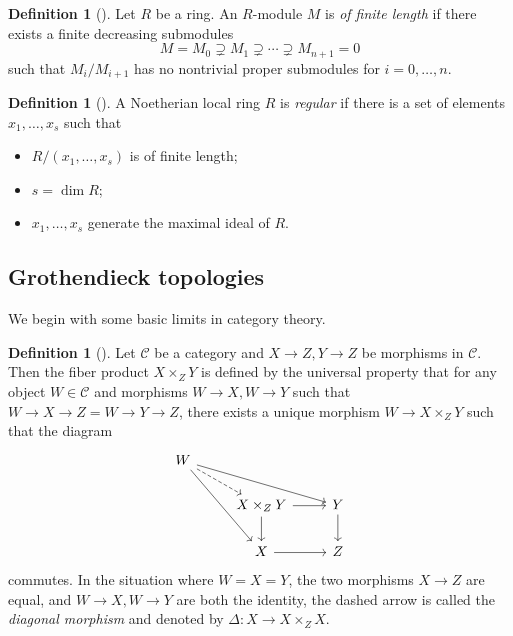 \documentclass{amsart}
\theoremstyle{definition}
\newtheorem{defn}[thm]{Definition}
\theoremstyle{remark}
\theoremstyle{plain}
\theoremstyle{definition}
\theoremstyle{remark}
\newcommand{\mc}[1]{\mathcal{#1}}
\newcommand{\1}{\mathbf{1}}
\newcommand{\2}{\mathbf{2}}
\newcommand{\3}{\mathbf{3}}
\begin{document}
\begin{defn}[{\cite[Definition 1.4.23]{canotes}}]
    Let $R$ be a ring. An $R$-module $M$ is \textit{of finite length} if there exists a finite decreasing submodules
    \[ M = M_0 \supsetneq M_1 \supsetneq \cdots \supsetneq M_{n+1} = 0 \]
    such that $M_i/M_{i+1}$ has no nontrivial proper submodules for $i=0,\ldots,n$.
\end{defn}


\begin{defn}[{\cite[Definition 3.2.15, Definition 3.2.16]{canotes}}]
    A Noetherian local ring $R$ is \textit{regular} if there is a set of elements $x_1, \ldots, x_s$ such that
    \begin{itemize}
        \item $R / (x_1, \ldots, x_s)$ is of finite length;
        \item $s = \dim R$;
        \item $x_1, \ldots, x_s$ generate the maximal ideal of $R$.
    \end{itemize}
\end{defn}



\subsection{Grothendieck topologies}

We begin with some basic limits in category theory.
\begin{defn}[{\cite[\href{https://stacks.math.columbia.edu/tag/001V}{Tag 001V}, \href{https://stacks.math.columbia.edu/tag/08N0}{Tag 08N0}]{stacks}}]
    Let $\mc{C}$ be a category and $X \to Z, Y \to Z$ be morphisms in $\mc{C}$. Then the fiber product $X \times_Z Y$ is defined by the universal property that for any object $W \in \mc{C}$ and morphisms $W \to X, W \to Y$ such that $W \to X \to Z = W \to Y \to Z$, there exists a unique morphism $W \to X \times_Z Y$ such that the diagram
    \begin{equation*}
    \begin{tikzcd}
        W \ar{drr} \ar[dashrightarrow]{dr} \ar{ddr} \\
        & X \times_Z Y \ar{r} \ar{d} & Y \ar{d} \\
        & X \ar{r} & Z
    \end{tikzcd}
    \end{equation*}
    commutes. In the situation where $W =X=Y$, the two morphisms $X \to Z$ are equal, and $W \to X, W \to Y$ are both the identity, the dashed arrow is called the \textit{diagonal morphism} and denoted by $\Delta \colon X \to X \times_Z X$.
\end{defn}
\end{document}
